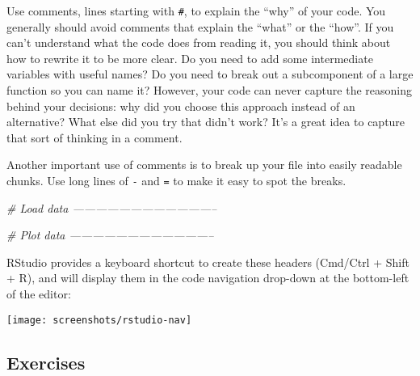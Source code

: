 \documentclass[]{book}
\newenvironment{Shaded}{\begin{snugshade}}{\end{snugshade}}
\newcommand{\CommentTok}[1]{\textcolor[rgb]{0.56,0.35,0.01}{\textit{{#1}}}}
\begin{document}
Use comments, lines starting with \texttt{\#}, to explain the ``why'' of
your code. You generally should avoid comments that explain the ``what''
or the ``how''. If you can't understand what the code does from reading
it, you should think about how to rewrite it to be more clear. Do you
need to add some intermediate variables with useful names? Do you need
to break out a subcomponent of a large function so you can name it?
However, your code can never capture the reasoning behind your
decisions: why did you choose this approach instead of an alternative?
What else did you try that didn't work? It's a great idea to capture
that sort of thinking in a comment.

Another important use of comments is to break up your file into easily
readable chunks. Use long lines of \texttt{-} and \texttt{=} to make it
easy to spot the breaks.

\begin{Shaded}
\begin{Highlighting}[]
\CommentTok{# Load data --------------------------------------}

\CommentTok{# Plot data --------------------------------------}
\end{Highlighting}
\end{Shaded}

RStudio provides a keyboard shortcut to create these headers (Cmd/Ctrl +
Shift + R), and will display them in the code navigation drop-down at
the bottom-left of the editor:

\begin{center}\texttt{[image: screenshots/rstudio-nav]} \end{center}

\subsection{Exercises}\label{exercises-48}
\end{document}
